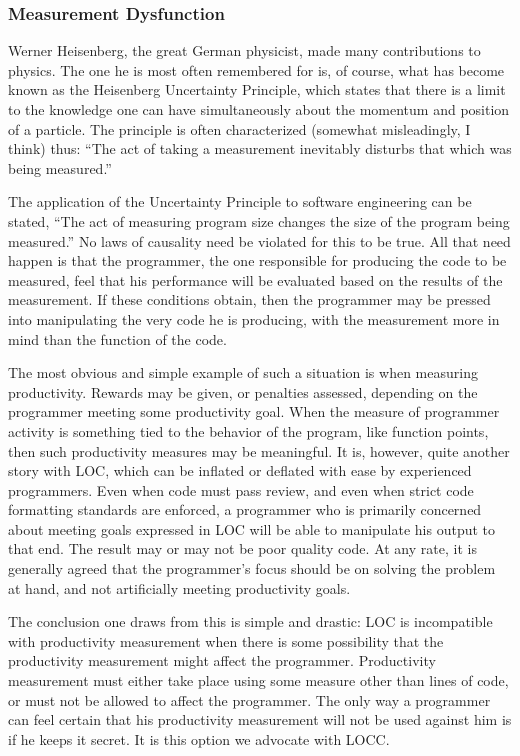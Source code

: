 \subsubsection{Measurement Dysfunction}
\label{dysfunction}

Werner Heisenberg, the great German physicist, made many contributions to
physics.  The one he is most often remembered for is, of course, what has
become known as the Heisenberg Uncertainty Principle, which states that
there is a limit to the knowledge one can have simultaneously about the
momentum and position of a particle.  The principle is often characterized
(somewhat misleadingly, I think) thus: ``The act of taking a measurement
inevitably disturbs that which was being measured.''

The application of the Uncertainty Principle to software
engineering can be stated, ``The act of measuring program size changes 
the size of the program being measured.''  No laws of causality need
be violated for this to be true.  All that need happen is that the
programmer, the one responsible for producing the code to be
measured, feel that his performance will be evaluated based on the
results of the measurement.  If these conditions obtain, then the
programmer may be pressed into manipulating the very code he is
producing, with the measurement more in mind than the function of the
code.

The most obvious and simple example of such a situation is when measuring
productivity.  Rewards may be given, or penalties assessed, depending on
the programmer meeting some productivity goal.  When the measure of
programmer activity is something tied to the behavior of the program, like
function points, then such productivity measures may be meaningful.  It is,
however, quite another story with LOC, which can be inflated or deflated
with ease by experienced programmers.  Even when code must pass review, and
even when strict code formatting standards are enforced, a programmer who
is primarily concerned about meeting goals expressed in LOC will be able to
manipulate his output to that end.  The result may or may not be poor
quality code.  At any rate, it is generally agreed that the programmer's
focus should be on solving the problem at hand, and not artificially
meeting productivity goals.

The conclusion one draws from this is simple and drastic: LOC is
incompatible with productivity measurement when there is some
possibility that the productivity measurement might affect the
programmer.  Productivity measurement must either take place using
some measure other than lines of code, or must not be allowed to
affect the programmer.  The only way a programmer can feel certain
that his productivity measurement will not be used against him is if
he keeps it secret.  It is this option we advocate with LOCC.

